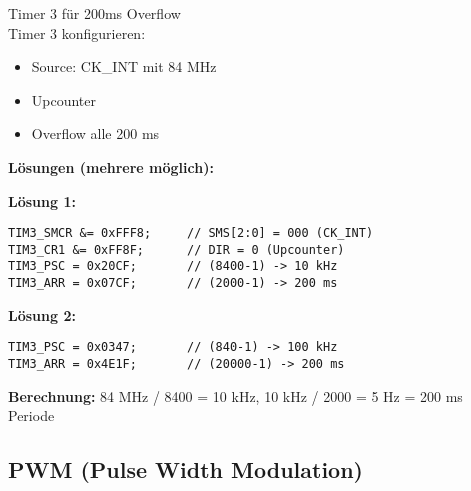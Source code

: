 \begin{example2}{Timer 3 für 200ms Overflow}\\
    Timer 3 konfigurieren:
    \begin{itemize}
        \item Source: CK\_INT mit 84 MHz
        \item Upcounter
        \item Overflow alle 200 ms
    \end{itemize}
    
    \tcblower
    
    \textbf{Lösungen (mehrere möglich):}
    
    \textbf{Lösung 1:}
\begin{lstlisting}[style=basesmol]
TIM3_SMCR &= 0xFFF8;     // SMS[2:0] = 000 (CK_INT)
TIM3_CR1 &= 0xFF8F;      // DIR = 0 (Upcounter)
TIM3_PSC = 0x20CF;       // (8400-1) -> 10 kHz
TIM3_ARR = 0x07CF;       // (2000-1) -> 200 ms
\end{lstlisting}
    
    \textbf{Lösung 2:}
\begin{lstlisting}[style=basesmol]
TIM3_PSC = 0x0347;       // (840-1) -> 100 kHz
TIM3_ARR = 0x4E1F;       // (20000-1) -> 200 ms
\end{lstlisting}
    
    \textbf{Berechnung:}
    84 MHz / 8400 = 10 kHz, 10 kHz / 2000 = 5 Hz = 200 ms Periode
\end{example2}

\subsection{PWM (Pulse Width Modulation)}

